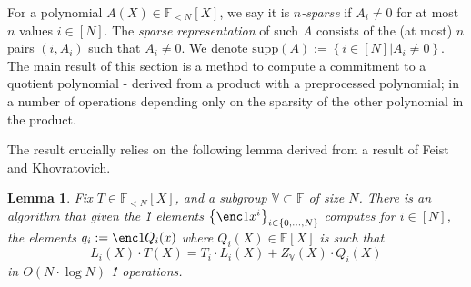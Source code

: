 \documentclass[11pt]{article} %
\newcommand{\F}{\ensuremath{\mathbb F}\xspace}
\newcommand{\defeq}{:=}
\newcommand{\sett}[2]{\ensuremath{\set{#1}_{#2}}\xspace}
\newcommand{\set}[1]{\ensuremath{\left\{#1\right\}}\xspace}
\newcommand{\polysofdeg}[1]{\ensuremath{\F_{< #1}[X]}\xspace}
\newtheorem{lemma}{Lemma}[section]
\newcommand{\bigspace}{\ensuremath{\mathbb{V}}\xspace}
\newcommand{\witsize}{\ensuremath{n}\xspace}
\newcommand{\tabsize}{\ensuremath{N}\xspace}
\newcommand{\supp}[1]{\ensuremath{\mathrm{supp}(#1)}\xspace}
\begin{document}
For a polynomial $A(X)\in \polysofdeg{\tabsize}$, we say it is \emph{\witsize-sparse} if $A_i\neq 0$ for at most \witsize values $i\in[\tabsize]$.
The \emph{sparse representation} of such $A$ consists of the (at most) \witsize pairs $(i,A_i)$ such that $A_i\neq 0$.
We denote $\supp{A}\defeq\set{i\in [\tabsize]| A_i\neq 0}$.\\


The main result of this section is a method to compute a commitment to a quotient polynomial - derived from a product with a preprocessed polynomial; in a number of operations depending only on the sparsity of the other polynomial in the product. 

The result crucially relies on the following lemma derived from a result of Feist and Khovratovich\cite{fastkzgproofsorig}.

\begin{lemma}
\label{lem:cq-compute}
Fix $T\in \polysofdeg{\tabsize}$, and a subgroup $\bigspace\subset \F$ of size \tabsize. 
There is an algorithm that given the \G1 elements $\sett{\enc1{x^i}}{i\in \set{0,\ldots,\tabsize}}$ computes for $i\in [\tabsize]$, the elements 
$q_i\defeq \enc1{Q_i(x)}$
where $Q_i(X)\in \F[X]$ is such that
\[L_i(X)\cdot T(X)=T_i\cdot L_i(X) + Z_\bigspace(X)\cdot Q_i(X)\]
in $O(\tabsize\cdot \log \tabsize)$ \G1 operations.
 
\end{lemma}
\end{document}
